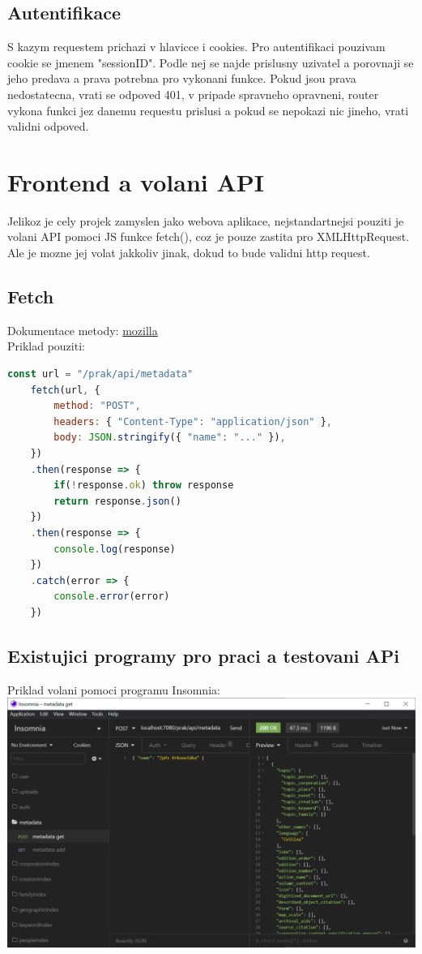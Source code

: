 \subsection{Autentifikace}
S kazym requestem prichazi v hlavicce i cookies.
Pro autentifikaci pouzivam cookie se jmenem "sessionID".
Podle nej se najde prislusny uzivatel a porovnaji se jeho predava a
prava potrebna pro vykonani funkce. Pokud jsou prava nedostatecna, 
vrati se odpoved 401, v pripade spravneho opravneni, router vykona funkci
jez danemu requestu prislusi a pokud se nepokazi nic jineho, vrati validni odpoved.

\section{Frontend a volani API}
Jelikoz je cely projek zamyslen jako webova aplikace, nejstandartnejsi pouziti
je volani API pomoci JS funkce fetch(), coz je pouze zastita pro XMLHttpRequest.
Ale je mozne jej volat jakkoliv jinak, dokud to bude validni http request.

\subsection{Fetch}
Dokumentace metody: \href{https://developer.mozilla.org/en-US/docs/Web/API/Fetch_API}{mozilla}
\\
Priklad pouziti:
\\
\begin{lstlisting}[language=JavaScript]
	const url = "/prak/api/metadata" 
	fetch(url, {
		method: "POST",
		headers: { "Content-Type": "application/json" },
		body: JSON.stringify({ "name": "..." }),
	})
	.then(response => {
		if(!response.ok) throw response
		return response.json()
	})
	.then(response => {
		console.log(response)
	})
	.catch(error => {
		console.error(error)
	})
\end{lstlisting}

\subsection{Existujici programy pro praci a testovani APi}
Priklad volani pomoci programu Insomnia:
\\
\includegraphics[width=\textwidth]{img/InsomniaExample.PNG}

